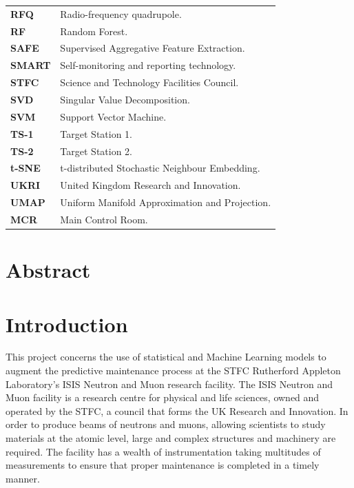 \documentclass[10pt,oneside]{report}
\begin{document}
\begin{table}[ht]
\begin{tabular}{ll}
        \textbf{RFQ} & Radio-frequency quadrupole. \\
        \textbf{RF} & Random Forest. \\
        \textbf{SAFE} & Supervised Aggregative Feature Extraction. \\
        \textbf{SMART} & Self-monitoring and reporting technology. \\
        \textbf{STFC} & Science and Technology Facilities Council. \\
        \textbf{SVD} & Singular Value Decomposition. \\
        \textbf{SVM} & Support Vector Machine. \\
        \textbf{TS-1} & Target Station 1. \\
        \textbf{TS-2} & Target Station 2. \\
        \textbf{t-SNE} & t-distributed Stochastic Neighbour Embedding. \\
        \textbf{UKRI} & United Kingdom Research and Innovation. \\
        \textbf{UMAP} & Uniform Manifold Approximation and Projection. \\
        \textbf{MCR} & Main Control Room. \\

    \end{tabular}
\end{table}

\clearpage


\chapter*{Abstract}


\chapter{Introduction}

This project concerns the use of statistical and Machine Learning models to augment the predictive maintenance process at the STFC Rutherford Appleton Laboratory's ISIS Neutron and Muon research facility. The ISIS Neutron and Muon facility is a research centre for physical and life sciences, owned and operated by the STFC, a council that forms the UK Research and Innovation. In order to produce beams of neutrons and muons, allowing scientists to study materials at the atomic level, large and complex structures and machinery are required. The facility has a wealth of instrumentation taking multitudes of measurements to ensure that proper maintenance is completed in a timely manner. \\
\end{document}
